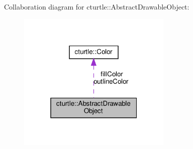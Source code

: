 Collaboration diagram for cturtle\+:\+:Abstract\+Drawable\+Object\+:\nopagebreak
\begin{figure}[H]
\begin{center}
\leavevmode
\includegraphics[width=208pt]{classcturtle_1_1AbstractDrawableObject__coll__graph}
\end{center}
\end{figure}
